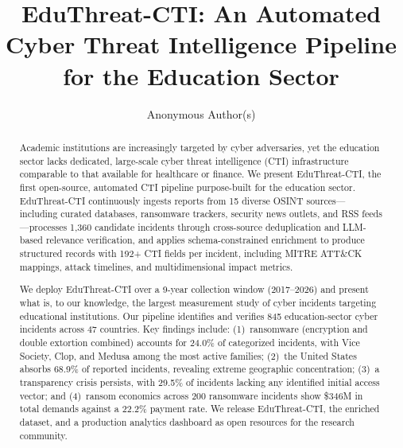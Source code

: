 \documentclass[sigconf,anonymous]{acmart}
\newcommand{\sys}{EduThreat-CTI\xspace}
\newcommand{\rawcollected}{1{,}360\xspace}       %
\newcommand{\numincidents}{845\xspace}            %
\newcommand{\numcountries}{47\xspace}
\newcommand{\numsources}{15\xspace}
\newcommand{\numransomware}{200\xspace}
\newcommand{\totaldemanded}{\$346M\xspace}
\newcommand{\paymentrate}{22.2\%\xspace}
\begin{document}
\title{EduThreat-CTI: An Automated Cyber Threat Intelligence Pipeline\\for the Education Sector}

\author{Anonymous Author(s)}

\begin{abstract}
Academic institutions are increasingly targeted by cyber adversaries, yet the education sector lacks dedicated, large-scale cyber threat intelligence (CTI) infrastructure comparable to that available for healthcare or finance. We present \sys, the first open-source, automated CTI pipeline purpose-built for the education sector. \sys continuously ingests reports from \numsources diverse OSINT sources---including curated databases, ransomware trackers, security news outlets, and RSS feeds---processes \rawcollected candidate incidents through cross-source deduplication and LLM-based relevance verification, and applies schema-constrained enrichment to produce structured records with 192+ CTI fields per incident, including MITRE ATT\&CK mappings, attack timelines, and multidimensional impact metrics.

We deploy \sys over a 9-year collection window (2017--2026) and present what is, to our knowledge, the largest measurement study of cyber incidents targeting educational institutions. Our pipeline identifies and verifies \numincidents education-sector cyber incidents across \numcountries countries. Key findings include: (1)~ransomware (encryption and double extortion combined) accounts for 24.0\% of categorized incidents, with Vice Society, Clop, and Medusa among the most active families; (2)~the United States absorbs 68.9\% of reported incidents, revealing extreme geographic concentration; (3)~a transparency crisis persists, with 29.5\% of incidents lacking any identified initial access vector; and (4)~ransom economics across \numransomware ransomware incidents show \totaldemanded in total demands against a \paymentrate payment rate. We release \sys, the enriched dataset, and a production analytics dashboard as open resources for the research community.
\end{abstract}

\begin{CCSCLASS}
\end{CCSCLASS}
\end{document}

